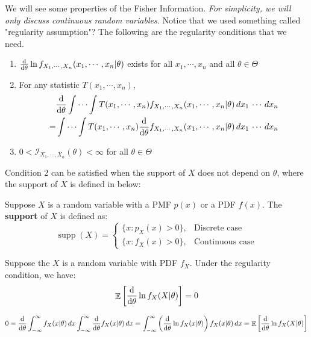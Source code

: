 \documentclass{huhtakm-template-book-v2}
\DeclareMathOperator{\E}{\mathbb{E}}
\DeclareMathOperator{\supp}{supp}
\begin{document}
\newpage
We will see some properties of the Fisher Information. \textit{For simplicity, we will only discuss continuous random variables.} Notice that we used something called "regularity assumption"? The following are the regularity conditions that we need.
\begin{enumerate}
	\item $\odv*{}{\theta}\ln{f_{X_{1},\cdots,X_{n}}}(x_{1},\cdots,x_{n}|\theta)$ exists for all $x_{1},\cdots,x_{n}$ and all $\theta\in\Theta$
	\item For any statistic $T(x_{1},\cdots,x_{n})$,
	\begin{align*}
		&\odv*{}{\theta}\int\cdots\int T(x_{1},\cdots,x_{n})f_{X_{1},\cdots,X_{n}}(x_{1},\cdots,x_{n}|\theta)\,dx_{1}\,\cdots\,dx_{n}\\
		=&\int\cdots\int T(x_{1},\cdots,x_{n})\odv*{}{\theta}f_{X_{1},\cdots,X_{n}}(x_{1},\cdots,x_{n}|\theta)\,dx_{1}\,\cdots\,dx_{n}
	\end{align*}
	\item $0<\mathcal{I}_{X_{1},\cdots,X_{n}}(\theta)<\infty$ for all $\theta\in\Theta$
\end{enumerate}
Condition 2 can be satisfied when the support of $X$ does not depend on $\theta$, where the support of $X$ is defined in below:
\begin{defn}
	Suppose $X$ is a random variable with a PMF $p(x)$ or a PDF $f(x)$. The \textbf{support} of $X$ is defined as:
	\begin{equation*}
		\supp(X)=\begin{cases}
			\{x:p_{X}(x)>0\}, &\text{Discrete case}\\
			\{x:f_{X}(x)>0\}, &\text{Continuous case}
		\end{cases}
	\end{equation*}
\end{defn}
\begin{lem}
	\label{Chapter 2 (Lemma) Expectation of Fisher Information but with first moment is zero}
	Suppose the $X$ is a random variable with PDF $f_{X}$. Under the regularity condition, we have:
	\begin{equation*}
		\E\left[\odv*{}{\theta}\ln{f_{X}(X|\theta)}\right]=0
	\end{equation*}
\end{lem}
\begin{proofing}
	\begin{equation*}
		0=\odv*{}{\theta}\intinfty f_{X}(x|\theta)\,dx\intinfty\odv*{}{\theta}f_{X}(x|\theta)\,dx=\intinfty\left(\odv*{}{\theta}\ln{f_{X}(x|\theta)}\right)f_{X}(x|\theta)\,dx=\E\left[\odv*{}{\theta}\ln{f_{X}(X|\theta)}\right]
	\end{equation*}
\end{proofing}
\end{document}
